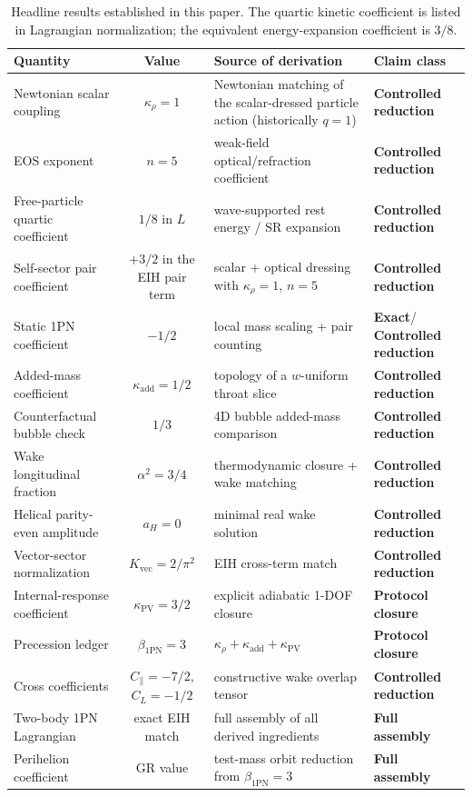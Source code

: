 \documentclass[11pt]{article}
\newcommand{\kadd}{\kappa_{\mathrm{add}}}
\newcommand{\kPV}{\kappa_{\mathrm{PV}}}
\newcommand{\krho}{\kappa_{\rho}}
\newcommand{\betaPN}{\beta_{\mathrm{1PN}}}
\newcommand{\Kvec}{K_{\mathrm{vec}}}
\newcommand{\alphaSq}{\alpha^2}
\newcommand{\Cpara}{C_{\parallel}}
\newcommand{\CLong}{C_{L}}
\newcommand{\Exact}{\textbf{Exact}}
\newcommand{\Controlled}{\textbf{Controlled reduction}}
\newcommand{\Protocol}{\textbf{Protocol closure}}
\newcommand{\FullMatch}{\textbf{Full assembly}}
\begin{document}
\begin{table}[H]
  \centering
  \caption{Headline results established in this paper. The quartic kinetic coefficient is listed in Lagrangian normalization; the equivalent energy-expansion coefficient is \(3/8\).}
  \label{tab:headline-results}
  \small
  \setlength{\tabcolsep}{4pt}
  \renewcommand{\arraystretch}{1.18}
  \begin{tabularx}{\linewidth}{@{}L c L L@{}}
    \toprule
    Quantity & Value & Source of derivation & Claim class \\
    \midrule
    Newtonian scalar coupling & \(\krho=1\) & Newtonian matching of the scalar-dressed particle action (historically \(q=1\)) & \Controlled \\
    EOS exponent & \(n=5\) & weak-field optical/refraction coefficient & \Controlled \\
    Free-particle quartic coefficient & \(1/8\) in \(L\) & wave-supported rest energy / SR expansion & \Controlled \\
    Self-sector pair coefficient & \(+3/2\) in the EIH pair term & scalar + optical dressing with \(\krho=1\), \(n=5\) & \Controlled \\
    Static 1PN coefficient & \(-1/2\) & local mass scaling + pair counting & \Exact / \Controlled \\
    Added-mass coefficient & \(\kadd=1/2\) & topology of a \(w\)-uniform throat slice & \Controlled \\
    Counterfactual bubble check & \(1/3\) & 4D bubble added-mass comparison & \Controlled \\
    Wake longitudinal fraction & \(\alphaSq=3/4\) & thermodynamic closure + wake matching & \Controlled \\
    Helical parity-even amplitude & \(a_H=0\) & minimal real wake solution & \Controlled \\
    Vector-sector normalization & \(\Kvec=2/\pi^2\) & EIH cross-term match & \Controlled \\
    Internal-response coefficient & \(\kPV=3/2\) & explicit adiabatic 1-DOF closure & \Protocol \\
    Precession ledger & \(\betaPN=3\) & \(\krho+\kadd+\kPV\) & \Protocol \\
    Cross coefficients & \(\Cpara=-7/2\), \(\CLong=-1/2\) & constructive wake overlap tensor & \Controlled \\
    Two-body 1PN Lagrangian & exact EIH match & full assembly of all derived ingredients & \FullMatch \\
    Perihelion coefficient & GR value & test-mass orbit reduction from \(\betaPN=3\) & \FullMatch \\
    \bottomrule
  \end{tabularx}
\end{table}
\end{document}
